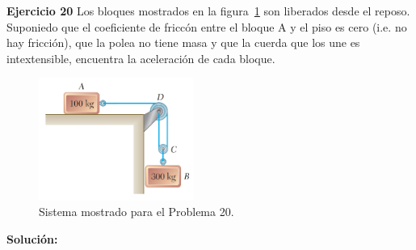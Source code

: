 \documentclass[a4paper,11pt]{scrartcl}
\begin{document}
\textbf{Ejercicio 20} Los bloques mostrados en la figura~\ref{fig:20_1} son liberados desde el reposo. Suponiedo que el coeficiente de friccón entre el bloque A y el piso es cero (i.e. no hay fricción), que la polea no tiene masa y que la cuerda que los une es intextensible, encuentra la aceleración de cada bloque. \\

\begin{figure}[H]
  \centering
  \includegraphics[height=4cm]{20_1}
  \caption{Sistema mostrado para el Problema 20.}
  \label{fig:20_1}
\end{figure}

\textbf{Solución:}
\end{document}

